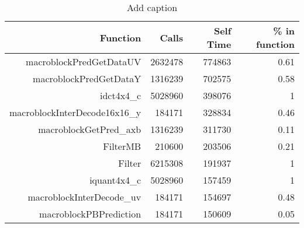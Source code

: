 \begin{table}[htbp]
  \centering
  \caption{Add caption}
    \begin{tabular}{rrrr}
    \addlinespace
    \toprule
    Function & Calls & Self Time & \% in function \\
    \midrule
    macroblockPredGetDataUV & 2632478 & 774863 & 0.61 \\
    macroblockPredGetDataY & 1316239 & 702575 & 0.58 \\
    idct4x4\_c & 5028960 & 398076 & 1 \\
    macroblockInterDecode16x16\_y & 184171 & 328834 & 0.46 \\
    macroblockGetPred\_axb & 1316239 & 311730 & 0.11 \\
    FilterMB & 210600 & 203506 & 0.21 \\
    Filter & 6215308 & 191937 & 1 \\
    iquant4x4\_c & 5028960 & 157459 & 1 \\
    macroblockInterDecode\_uv & 184171 & 154697 & 0.48 \\
    macroblockPBPrediction & 184171 & 150609 & 0.05 \\
    \bottomrule
    \end{tabular}
  \label{tab:addlabel}
\end{table}
